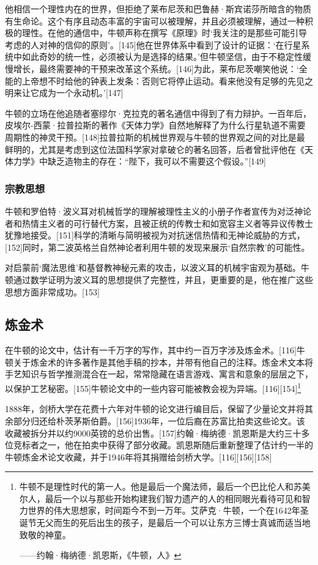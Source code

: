 他相信一个理性内在的世界，但拒绝了莱布尼茨和巴鲁赫·斯宾诺莎所暗含的物质有生命论。这个有序且动态丰富的宇宙可以被理解，并且必须被理解，通过一种积极的理性。在他的通信中，牛顿声称在撰写《原理》时‘我关注的是那些可能引导考虑的人对神的信仰的原则’。[145]他在世界体系中看到了设计的证据：‘在行星系统中如此奇妙的统一性，必须被认为是选择的结果。’但牛顿坚信，由于不稳定性缓慢增长，最终需要神的干预来改革这个系统。[146]为此，莱布尼茨嘲笑他说：‘全能的上帝想不时给他的钟表上发条：否则它将停止运动。看来他没有足够的先见之明来让它成为一个永动机。’[147]

牛顿的立场在他追随者塞缪尔·克拉克的著名通信中得到了有力辩护。一百年后，皮埃尔-西蒙·拉普拉斯的著作《天体力学》自然地解释了为什么行星轨道不需要周期性的神灵干预。[148]拉普拉斯的机械世界观与牛顿的世界观之间的对比是最鲜明的，尤其是考虑到这位法国科学家对拿破仑的著名回答，后者曾批评他在《天体力学》中缺乏造物主的存在：“陛下，我可以不需要这个假设。”[149]
\subsubsection{宗教思想}  
牛顿和罗伯特·波义耳对机械哲学的理解被理性主义的小册子作者宣传为对泛神论者和热情主义者的可行替代方案，且被正统的传教士和如宽容主义者等异议传教士犹豫地接受。[151]科学的清晰与简明被视为对抗迷信热情和无神论威胁的方式，[152]同时，第二波英格兰自然神论者利用牛顿的发现来展示‘自然宗教’的可能性。

对启蒙前‘魔法思维’和基督教神秘元素的攻击，以波义耳的机械宇宙观为基础。牛顿通过数学证明为波义耳的思想提供了完整性，并且，更重要的是，他在推广这些思想方面非常成功。[153]
\subsection{炼金术}
在牛顿的论文中，估计有一千万字的写作，其中约一百万字涉及炼金术。[116]牛顿关于炼金术的许多著作是其他手稿的抄本，并带有他自己的注释。炼金术文本将手艺知识与哲学推测混合在一起，常常隐藏在语言游戏、寓言和意象的层层之下，以保护工艺秘密。[155]牛顿论文中的一些内容可能被教会视为异端。[116][154]\footnote{牛顿不是理性时代的第一人。他是最后一个魔法师，最后一个巴比伦人和苏美尔人，最后一个以与那些开始构建我们智力遗产的人的相同眼光看待可见和智力世界的伟大思想家，时间距今不到一万年。艾萨克·牛顿，一个在1642年圣诞节无父而生的死后出生的孩子，是最后一个可以让东方三博士真诚而适当地致敬的神童。

——约翰·梅纳德·凯恩斯，《牛顿，人》}

1888年，剑桥大学在花费十六年对牛顿的论文进行编目后，保留了少量论文并将其余部分归还给朴茨茅斯伯爵。[156]1936年，一位后裔在苏富比拍卖这些论文。该收藏被拆分并以约9000英镑的总价出售。[157]约翰·梅纳德·凯恩斯是大约三十多位竞标者之一，他在拍卖中获得了部分收藏。凯恩斯随后重新整理了估计约一半的牛顿炼金术论文收藏，并于1946年将其捐赠给剑桥大学。[116][156][158]

